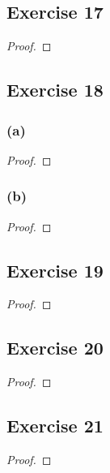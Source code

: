 \documentclass[14pt]{extarticle}
\begin{document}
\subsection{Exercise 17}

\begin{proof}

\end{proof}

\subsection{Exercise 18}

\subsubsection{(a)}

\begin{proof}

\end{proof}

\subsubsection{(b)}

\begin{proof}

\end{proof}

\subsection{Exercise 19}

\begin{proof}

\end{proof}

\subsection{Exercise 20}

\begin{proof}

\end{proof}

\subsection{Exercise 21}

\begin{proof}

\end{proof}
\end{document}
